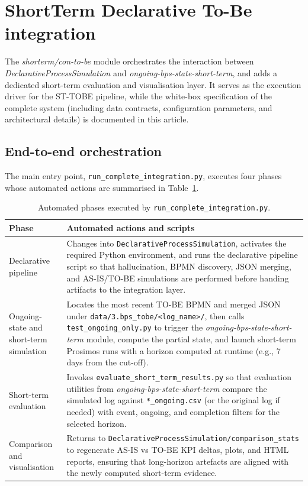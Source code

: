 \documentclass[a4paper,fleqn]{cas-sc}
\begin{document}
\section{ShortTerm Declarative To-Be integration}
\label{sec:integration}

The \emph{shorterm/con-to-be} module orchestrates the
interaction between \emph{DeclarativeProcessSimulation} and
\emph{ongoing-bps-state-short-term}, and adds a dedicated
short-term evaluation and visualisation layer.
It serves as the execution driver for the ST-TOBE pipeline,
while the white-box specification of the complete system (including
data contracts, configuration parameters, and architectural details)
is documented in this article.

\subsection{End-to-end orchestration}

The main entry point, \verb|run_complete_integration.py|,
executes four phases whose automated actions are summarised in
Table~\ref{tbl:orchestration_phases}.

\begin{table}[width=.95\linewidth,cols=2,pos=t]
\caption{Automated phases executed by \texttt{run\_complete\_integration.py}.}
\label{tbl:orchestration_phases}
\begin{tabular*}{\tblwidth}{@{} p{} p{} @{}}
\toprule
Phase & Automated actions and scripts \\
\midrule
Declarative pipeline & Changes into \verb|DeclarativeProcessSimulation|, activates the required Python environment, and runs the declarative pipeline script so that hallucination, BPMN discovery, JSON merging, and AS-IS/TO-BE simulations are performed before handing artifacts to the integration layer. \\
Ongoing-state and short-term simulation & Locates the most recent TO-BE BPMN and merged JSON under \verb|data/3.bps_tobe/<log_name>/|, then calls \verb|test_ongoing_only.py| to trigger the \emph{ongoing-bps-state-short-term} module, compute the partial state, and launch short-term Prosimos runs with a horizon computed at runtime (e.g., 7 days from the cut-off). \\
Short-term evaluation & Invokes \verb|evaluate_short_term_results.py| so that evaluation utilities from \emph{ongoing-bps-state-short-term} compare the simulated log against \verb|*_ongoing.csv| (or the original log if needed) with event, ongoing, and completion filters for the selected horizon. \\
Comparison and visualisation & Returns to \verb|DeclarativeProcessSimulation/comparison_stats| to regenerate AS-IS vs TO-BE KPI deltas, plots, and HTML reports, ensuring that long-horizon artefacts are aligned with the newly computed short-term evidence. \\
\bottomrule
\end{tabular*}
\end{table}
\end{document}
